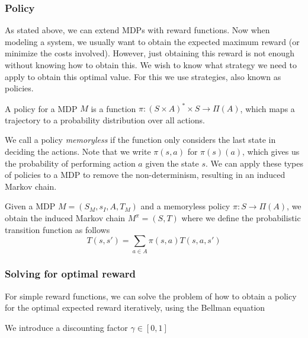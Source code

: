 \subsubsection*{Policy}
As stated above, we can extend MDPs with reward functions. Now when modeling a system, we usually want to obtain the expected maximum reward (or minimize the costs involved). However, just obtaining this reward is not enough without knowing how to obtain this. We wish to know what strategy we need to apply to obtain this optimal value. For this we use strategies, also known as policies. 

\begin{definition}[Policy]
	A policy for a MDP $M$ is a function $\pi:(S\times A)^*\times S \to \Pi(A)$, which maps a trajectory to a probability distribution over all actions. 
\end{definition}

We call a policy \textit{memoryless} if the function only considers the last state in deciding the actions. Note that we write $\pi(s,a)$ for $\pi(s)(a)$, which gives us the probability of performing action $a$ given the state $s$. We can apply these types of policies to a MDP to remove the non-determinism, resulting in an induced Markov chain.

\begin{definition}
Given a MDP $M=(S_M,s_I,A,T_M)$ and a memoryless policy $\pi:S\to\Pi(A)$, we obtain the induced Markov chain $M^\pi=(S,T)$ where we define the probabilistic transition function as follows \[ T(s,s') = \sum\limits_{a\in A} \pi(s,a) T(s,a,s')\]
\end{definition}

\subsubsection*{Solving for optimal reward}
For simple reward functions, we can solve the problem of how to obtain a policy for the optimal expected reward iteratively, using the Bellman equation 

We introduce a discounting factor $\gamma\in[0,1]$


